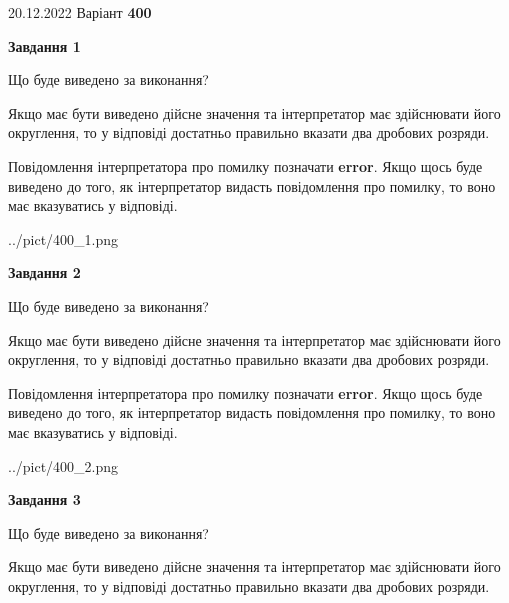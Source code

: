 \documentclass[12pt, ukrainian]{article}
\begin{document}
{20.12.2022 Варіант \No \textbf { 400 }\par}
{
\begin {Large}

{\begin {center}\textbf{Завдання 1}\end {center}}\par
Що буде виведено за виконання? \par

Якщо має бути виведено дійсне значення та інтерпретатор має здійснювати його округлення, 
то у відповіді достатньо правильно вказати два дробових розряди.

Повідомлення інтерпретатора про помилку позначати \textbf{error}.
Якщо щось буде виведено до того, як інтерпретатор видасть повідомлення про помилку, 
то воно має вказуватись у відповіді. \par

\begin{center}
	{../pict/400_1.png}
\end{center}
\newpage

{\begin {center}\textbf{Завдання 2}\end {center}}\par
Що буде виведено за виконання? \par

Якщо має бути виведено дійсне значення та інтерпретатор має здійснювати його округлення, 
то у відповіді достатньо правильно вказати два дробових розряди.

Повідомлення інтерпретатора про помилку позначати \textbf{error}.
Якщо щось буде виведено до того, як інтерпретатор видасть повідомлення про помилку, 
то воно має вказуватись у відповіді. \par

\begin{center}
	{../pict/400_2.png}
\end{center}
\newpage

{\begin {center}\textbf{Завдання 3}\end {center}}\par
Що буде виведено за виконання? \par

Якщо має бути виведено дійсне значення та інтерпретатор має здійснювати його округлення, 
то у відповіді достатньо правильно вказати два дробових розряди.


\end{Large}}
\end{document}
